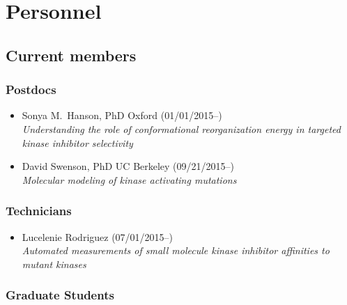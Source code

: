 \documentclass[10pt]{article}
\begin{document}
\section*{Personnel}

\subsection*{Current members}

\subsubsection*{Postdocs}

\begin{itemize}
  \item Sonya M.~Hanson, PhD Oxford (01/01/2015--)\\
  \emph{Understanding the role of conformational reorganization energy in targeted kinase inhibitor selectivity}

  \item David Swenson, PhD UC Berkeley (09/21/2015--)\\
  \emph{Molecular modeling of kinase activating mutations}
\end{itemize}

\subsubsection*{Technicians}

\begin{itemize}
  \item Lucelenie Rodriguez (07/01/2015--)\\
  \emph{Automated measurements of small molecule kinase inhibitor affinities to mutant kinases}
\end{itemize}

\subsubsection*{Graduate Students}
\end{document}
